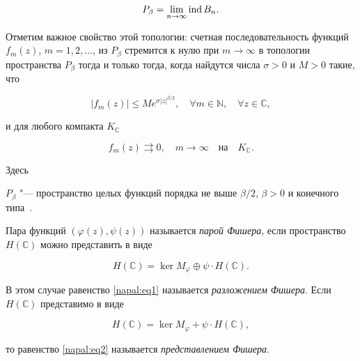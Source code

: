 $$P_{\beta}= \lim\limits_{n \to \infty} \mathop{\rm ind} B_{n}.$$



Отметим важное свойство этой топологии: счетная последовательность функций $f_m(z)$, $m =1, 2, \dots$,  из  $P_\beta $   стремится к нулю при $m\to \infty$ в топологии пространства $P_\beta$ тогда и только тогда, когда найдутся числа $\sigma>0$ и $M>0$ такие, что

$$

\left|f_m(z)\right|\leq Me^{\sigma\left|z\right|^{\beta/2}}, \quad \forall m\in \mathbb{N}, \quad \forall z\in \mathbb{C},

$$

и для любого компакта $K_\mathbb{C}$

$$

f_m(z) \rightrightarrows 0, \quad  m\to \infty \quad \text{на} \quad K_\mathbb{C}.

$$

Здесь

$P_\beta$ "--- пространство целых функций  порядка не выше ${\beta}/{2}$, $\beta > 0$ и конечного типа~\cite{napal:bib11,napal:bib12}.



\begin{definition}Пара функций $(\varphi(z),\psi(z))$ называется \textit{парой Фишера}, если пространство $H(\mathbb{C})$ можно представить в виде

\begin{equation}\label{napal:eq1}

    H(\mathbb{C}) = \ker M_\varphi \oplus \psi \cdot H(\mathbb{C}).

\end{equation}



  В этом случае равенство \eqref{napal:eq1} называется \textit{разложением Фишера}. Если $H(\mathbb{C})$ представимо в виде

\begin{equation}\label{napal:eq2}

H(\mathbb{C}) = \ker M_\varphi + \psi \cdot H(\mathbb{C}),

\end{equation}

то равенство \eqref{napal:eq2} называется \textit{представлением Фишера}.

\end{definition}




